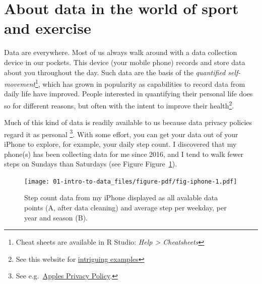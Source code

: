 \documentclass[
  11pt,
  letterpaper,
]{scrbook}
\begin{document}
\hypertarget{about-data-in-the-world-of-sport-and-exercise}{%
\section{About data in the world of sport and
exercise}\label{about-data-in-the-world-of-sport-and-exercise}}

Data are everywhere. Most of us always walk around with a data
collection device in our pockets. This device (your mobile phone)
records and store data about you throughout the day. Such data are the
basis of the \emph{quantified self-movement}\footnote{Cheat sheets are
  available in R Studio: \emph{Help \textgreater{} Cheatsheets}}, which
has grown in popularity as capabilities to record data from daily life
have improved. People interested in quantifying their personal life does
so for different reasons, but often with the intent to improve their
health\footnote{See this website for
  \href{https://quantifiedself.com/show-and-tell/}{intriguing examples}}.

Much of this kind of data is readily available to us because data
privacy policies regard it as personal \footnote{See
  e.g.~\href{https://www.apple.com/legal/privacy/en-ww/}{Apples Privacy
  Policy}.}. With some effort, you can get your data out of your iPhone
to explore, for example, your daily step count. I discovered that my
phone(s) has been collecting data for me since 2016, and I tend to walk
fewer steps on Sundays than Saturdays (see Figure
Figure~\ref{fig-iphone}).

\begin{figure}

{\centering \texttt{[image: 01-intro-to-data\_files/figure-pdf/fig-iphone-1.pdf]}

}

\caption{\label{fig-iphone}Step count data from my iPhone displayed as
all avalable data points (A, after data cleaning) and average step per
weekday, per year and season (B).}

\end{figure}
\end{document}
